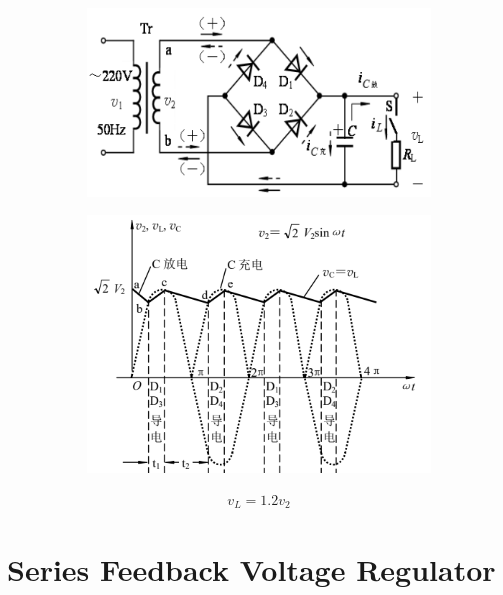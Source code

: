 \begin{figure}[H]
  \centering
  \begin{subfigure}{.5\textwidth}
    \centering
    \includegraphics[width=\linewidth]{figures/Filter-1}
  \end{subfigure}
  \begin{subfigure}{.45\textwidth}
    \centering
    \includegraphics[width=\linewidth]{figures/Filter-2}
  \end{subfigure}
\end{figure}

\begin{equation*}
  \begin{aligned}
    v_L = 1.2 v_2
  \end{aligned}
\end{equation*}



\section{Series Feedback Voltage Regulator}

